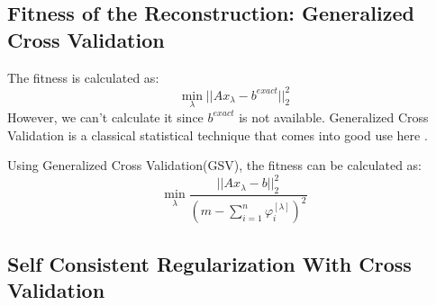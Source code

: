 \documentclass{article}
\begin{document}
\subsection{Fitness of the Reconstruction: Generalized Cross Validation}
The fitness is calculated as:
\begin{equation}
	\mathop {\min }\limits_\lambda  ||A{x_\lambda } - {b^{exact}}||_2^2
\end{equation}
However, we can't calculate it since \(b^{exact}\) is not available. Generalized 
Cross Validation is a classical statistical technique that comes into good use
here \cite{hansen2010discrete}.

Using Generalized Cross Validation(GSV), the fitness can be calculated as:
\begin{equation}
	\mathop {\min }\limits_\lambda  \frac{{||A{x_\lambda } - b||_2^2}}{{{{(m -
	\sum\nolimits_{i = 1}^n {\varphi _i^{[\lambda ]}} )}^2}}}
	\label{eq:disintegral}
\end{equation}
\subsection{Self Consistent Regularization With Cross Validation}
\end{document}
